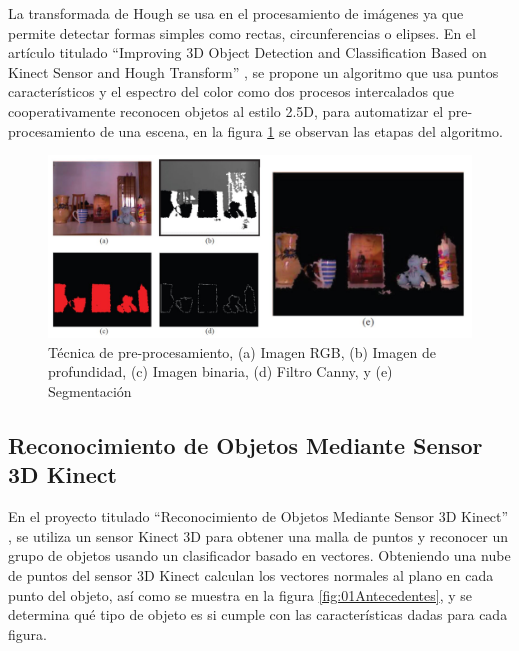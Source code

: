         La transformada de Hough se usa en el procesamiento de imágenes ya que permite detectar formas simples como rectas, circunferencias o elipses. En el artículo titulado “Improving 3D Object Detection and Classification Based on Kinect Sensor and Hough Transform” \cite{CompVisionKinecthough}, se propone un algoritmo que usa puntos característicos y el espectro del color como dos procesos intercalados que cooperativamente reconocen objetos al estilo 2.5D, para automatizar el pre-procesamiento de una escena, en la figura \ref{fig:03Antecedentes} se observan las etapas del algoritmo.\\
    
        \begin{figure}[!htb]
            \centering
            \includegraphics[width=1\textwidth]{01Introduccion/imagenes/03Antecedentes.jpg}
            \caption[Técnica de pre-procesamiento]{Técnica de pre-procesamiento, (a) Imagen RGB, (b) Imagen de profundidad, (c) Imagen binaria, (d) Filtro Canny, y (e) Segmentación}%
            \label{fig:03Antecedentes}
        \end{figure}
    
    
    \subsection{Reconocimiento de Objetos Mediante Sensor 3D Kinect}
    
        En el proyecto titulado “Reconocimiento de Objetos Mediante Sensor 3D Kinect” \cite{RecoObj3d}, se utiliza un sensor Kinect 3D para obtener una malla de puntos y reconocer un grupo de objetos usando un clasificador basado en vectores. Obteniendo una nube de puntos del sensor 3D Kinect calculan los vectores normales al plano en cada punto del objeto, así como se muestra en la figura \ref{fig:01Antecedentes}, y se determina qué tipo de objeto es si cumple con las características dadas para cada figura. \\
        

